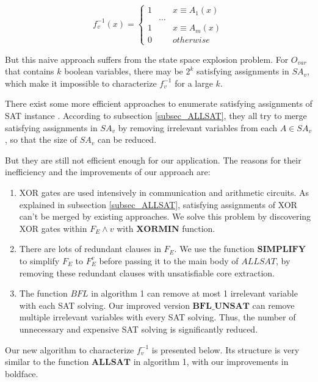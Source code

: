 \documentclass[journal]{IEEEtran}
\begin{document}
\begin{equation}\label{fneg1v}
f^{-1}_v(x) = \left\{ \begin{array}{lll}
1 & & x\equiv A_1(x) \\
  & \dots &  \\
1 & & x\equiv A_m(x) \\
0 & & otherwise
\end{array}
\right.
\end{equation}

But this naive approach suffers from the state space explosion problem.
For $O_{var}$ that contains $k$ boolean variables,
there may be $2^k$ satisfying assignments in $SA_v$,
which make it impossible to characterize $f^{-1}_v$ for a large $k$.

There exist some more efficient approaches
to enumerate satisfying assignments of SAT instance
\cite{PRIMECLAUSE,SATUNBMC,MINASS,EFFCON,MINCEX,MEMEFFALLSAT,REPARAM,EFFSATUSMCCO}.
According to subsection \ref{subsec_ALLSAT},
they all try to merge satisfying assignments in $SA_v$ by removing irrelevant variables from each $A\in SA_v$,
so that the size of $SA_v$ can be reduced.

But they are still not efficient enough for our application.
The reasons for their inefficiency and the improvements of our approach are:
\begin{enumerate}
\item XOR gates are used intensively in communication and arithmetic circuits.
As explained in subsection \ref{subsec_ALLSAT},
satisfying assignments of XOR can't be merged by existing approaches.
We solve this problem by discovering XOR gates within $F_E\wedge v$ with $\boldsymbol{XORMIN}$ function.
\item There are lots of redundant clauses in $F_E$.
We use the function $\boldsymbol{SIMPLIFY}$ to simplify $F_E$ to $F_E^v$ before passing it to the main body of $ALLSAT$,
by removing these redundant clauses with unsatisfiable core extraction.
\item The function $BFL$ in algorithm 1 can remove at most 1 irrelevant variable with each SAT solving. Our improved version $\boldsymbol{BFL\_UNSAT}$ can remove multiple irrelevant variables with every SAT solving. Thus, the number of unnecessary and expensive SAT solving is significantly reduced.
\end{enumerate}

Our new algorithm to characterize $f^{-1}_v$ is presented below.
Its structure is very similar to the function $\boldsymbol{ALLSAT}$ in algorithm 1,
with our improvements in boldface.
\end{document}
